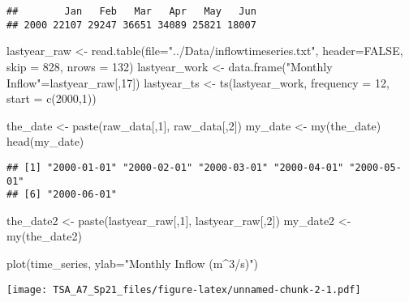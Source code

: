 \documentclass[
]{article}
\newenvironment{Shaded}{\begin{snugshade}}{\end{snugshade}}
\newcommand{\AttributeTok}[1]{\textcolor[rgb]{0.77,0.63,0.00}{#1}}
\newcommand{\ConstantTok}[1]{\textcolor[rgb]{0.00,0.00,0.00}{#1}}
\newcommand{\DecValTok}[1]{\textcolor[rgb]{0.00,0.00,0.81}{#1}}
\newcommand{\FunctionTok}[1]{\textcolor[rgb]{0.00,0.00,0.00}{#1}}
\newcommand{\NormalTok}[1]{#1}
\newcommand{\OtherTok}[1]{\textcolor[rgb]{0.56,0.35,0.01}{#1}}
\newcommand{\StringTok}[1]{\textcolor[rgb]{0.31,0.60,0.02}{#1}}
\begin{document}
\begin{verbatim}
##        Jan   Feb   Mar   Apr   May   Jun
## 2000 22107 29247 36651 34089 25821 18007
\end{verbatim}

\begin{Shaded}
\begin{Highlighting}[]
\NormalTok{lastyear\_raw }\OtherTok{\textless{}{-}} \FunctionTok{read.table}\NormalTok{(}\AttributeTok{file=}\StringTok{"../Data/inflowtimeseries.txt"}\NormalTok{, }\AttributeTok{header=}\ConstantTok{FALSE}\NormalTok{, }\AttributeTok{skip =} \DecValTok{828}\NormalTok{, }\AttributeTok{nrows =} \DecValTok{132}\NormalTok{)}
\NormalTok{lastyear\_work }\OtherTok{\textless{}{-}} \FunctionTok{data.frame}\NormalTok{(}\StringTok{"Monthly Inflow"}\OtherTok{=}\NormalTok{lastyear\_raw[,}\DecValTok{17}\NormalTok{])}
\NormalTok{lastyear\_ts }\OtherTok{\textless{}{-}} \FunctionTok{ts}\NormalTok{(lastyear\_work, }\AttributeTok{frequency =} \DecValTok{12}\NormalTok{, }\AttributeTok{start =} \FunctionTok{c}\NormalTok{(}\DecValTok{2000}\NormalTok{,}\DecValTok{1}\NormalTok{))}

\NormalTok{the\_date }\OtherTok{\textless{}{-}} \FunctionTok{paste}\NormalTok{(raw\_data[,}\DecValTok{1}\NormalTok{], raw\_data[,}\DecValTok{2}\NormalTok{])}
\NormalTok{my\_date }\OtherTok{\textless{}{-}} \FunctionTok{my}\NormalTok{(the\_date)}
\FunctionTok{head}\NormalTok{(my\_date)}
\end{Highlighting}
\end{Shaded}

\begin{verbatim}
## [1] "2000-01-01" "2000-02-01" "2000-03-01" "2000-04-01" "2000-05-01"
## [6] "2000-06-01"
\end{verbatim}

\begin{Shaded}
\begin{Highlighting}[]
\NormalTok{the\_date2 }\OtherTok{\textless{}{-}} \FunctionTok{paste}\NormalTok{(lastyear\_raw[,}\DecValTok{1}\NormalTok{], lastyear\_raw[,}\DecValTok{2}\NormalTok{])}
\NormalTok{my\_date2 }\OtherTok{\textless{}{-}} \FunctionTok{my}\NormalTok{(the\_date2)}


\FunctionTok{plot}\NormalTok{(time\_series, }\AttributeTok{ylab=}\StringTok{"Monthly Inflow (m\^{}3/s)"}\NormalTok{)}
\end{Highlighting}
\end{Shaded}

\texttt{[image: TSA\_A7\_Sp21\_files/figure-latex/unnamed-chunk-2-1.pdf]}
\end{document}

